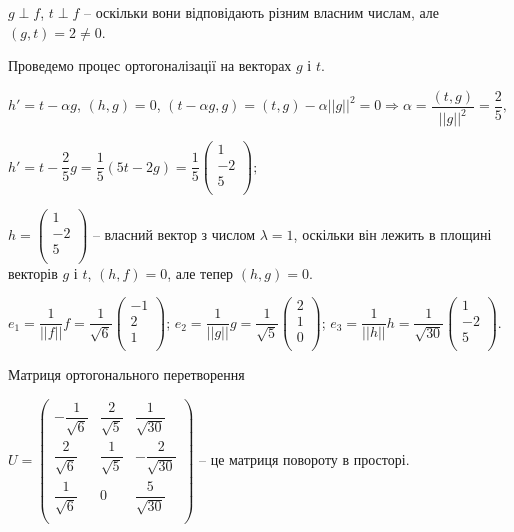 $g \perp f$, $t \perp f$ -- оскільки вони відповідають різним власним числам, але
$(g,t) = 2 \neq 0$.

Проведемо процес ортогоналізації на векторах $g$ і $t$.

$h' = t -\alpha g$, $(h,g) = 0$,
$(t - \alpha g ,g) = (t,g) - \alpha ||g||^2 = 0 \Rightarrow \alpha = \dfrac{(t,g)}{||g||^2} = \dfrac{2}{5},$

$h' = t - \dfrac{2}{5}g = \dfrac{1}{5}(5t - 2g) = \dfrac{1}{5}\begin{pmatrix}
	1 \\
	-2 \\
	5 \\
\end{pmatrix};$

$h = \begin{pmatrix}
	1 \\
	-2 \\
	5 \\
\end{pmatrix}$ -- власний вектор з числом $\lambda = 1$, оскільки він лежить в площині
векторів $g$ і $t$, $(h,f) = 0$, але тепер $(h, g) = 0$.

$e_1 = \dfrac{1}{||f||}f = \dfrac{1}{\sqrt{6}}\begin{pmatrix}
	-1 \\
	2 \\
	1 \\
\end{pmatrix}$; $e_2 = \dfrac{1}{||g||}g = \dfrac{1}{\sqrt{5}}\begin{pmatrix}
	2 \\
	1 \\
	0 \\
\end{pmatrix}$; $e_3 = \dfrac{1}{||h||}h = \dfrac{1}{\sqrt{30}} \begin{pmatrix}
	1 \\
	-2 \\
	5 \\
\end{pmatrix}$.

Матриця ортогонального перетворення

$U = \begin{pmatrix}
	-\dfrac{1}{\sqrt{6}} & \dfrac{2}{\sqrt{5}} & \dfrac{1}{\sqrt{30}} \\
	\dfrac{2}{\sqrt{6}}  & \dfrac{1}{\sqrt{5}} & -\dfrac{2}{\sqrt{30}} \\
	\dfrac{1}{\sqrt{6}}  & 0                   & \dfrac{5}{\sqrt{30}} \\
\end{pmatrix}$ -- це матриця повороту в просторі.

